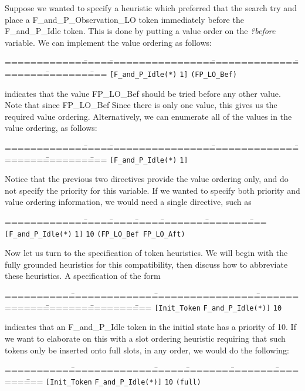 Suppose we wanted to specify a heuristic which preferred that the
search try and place a F\_and\_P\_Observation\_LO token immediately
before the F\_and\_P\_Idle token.  This is done by putting a value
order on the {\em ?before} variable.  We can implement the value
ordering as follows:
\begin{tabbing}
============\=====\=================\==============\========\========\====\kill
{\tt[F\_and\_P\_Idle(*)} \> {\tt 1]} \> {\tt (FP\_LO\_Bef)} \\
\end{tabbing}
indicates that the value FP\_LO\_Bef should be tried before any other value.  
Note that since FP\_LO\_Bef
Since
there is only one value, this gives us the required value ordering.  Alternatively,
we can enumerate all of the values in the value ordering, as follows:
\begin{tabbing}
============\=====\=================\==============\========\========\====\kill
{\tt[F\_and\_P\_Idle(*)} \> {\tt 1]}  \\
\end{tabbing}
Notice that the previous two directives provide the value ordering only, and
do not specify the priority for this variable.  If we wanted to specify both
priority and value ordering information, we would need a single directive,
such as 
\begin{tabbing}
============\=====\=====\=====\========\========\====\kill
{\tt[F\_and\_P\_Idle(*)} \> {\tt 1]} \> {\tt 10} \> {\tt (FP\_LO\_Bef FP\_LO\_Aft)} \\
\end{tabbing}

Now let us turn to the specification of token heuristics.  
We will begin with the fully grounded heuristics for this compatibility, then 
discuss how to abbreviate these heuristics.  A specification of the form
\begin{tabbing}
==========\==============\=================\==============\========\========\====\kill
{\tt [Init\_Token} \> {\tt  F\_and\_P\_Idle(*)]} \> {\tt 10} \\
\end{tabbing}
indicates that an F\_and\_P\_Idle token in the initial state has a priority of 10.
If we want to elaborate on this with a slot ordering heuristic requiring that such
tokens only be inserted onto full slots, in any order, we would do the following:

\begin{tabbing}
==========\==============\======\========\========\========\====\kill
{\tt [Init\_Token} \> {\tt  F\_and\_P\_Idle(*)]} \> {\tt 10} \> {\tt (full)}\\
\end{tabbing}


